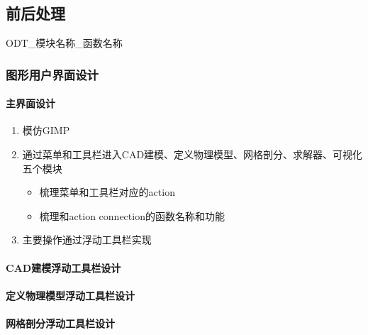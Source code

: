 \documentclass[letterpaper,10pt,english]{sphinxmanual}
\begin{document}
\subsection{前后处理}
\label{\detokenize{src/fengsim/prepost:id1}}\label{\detokenize{src/fengsim/prepost::doc}}
\sphinxAtStartPar
ODT\_模块名称\_函数名称


\subsubsection{图形用户界面设计}
\label{\detokenize{src/fengsim/prepost:id2}}

\paragraph{主界面设计}
\label{\detokenize{src/fengsim/prepost:id3}}\begin{enumerate}
%
\item {} 
\sphinxAtStartPar
模仿GIMP

\item {} 
\sphinxAtStartPar
通过菜单和工具栏进入CAD建模、定义物理模型、网格剖分、求解器、可视化五个模块
\begin{itemize}
\item {} 
\sphinxAtStartPar
梳理菜单和工具栏对应的action

\item {} 
\sphinxAtStartPar
梳理和action connection的函数名称和功能

\end{itemize}

\item {} 
\sphinxAtStartPar
主要操作通过浮动工具栏实现

\end{enumerate}


\paragraph{CAD建模浮动工具栏设计}
\label{\detokenize{src/fengsim/prepost:cad}}

\paragraph{定义物理模型浮动工具栏设计}
\label{\detokenize{src/fengsim/prepost:id4}}

\paragraph{网格剖分浮动工具栏设计}
\label{\detokenize{src/fengsim/prepost:id5}}
\end{document}
